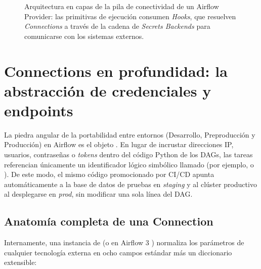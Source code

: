 \begin{figure}[htbp]
{%
}
\caption{Arquitectura en capas de la pila de conectividad de un Airflow Provider: las primitivas de ejecución consumen \textit{Hooks}, que resuelven \textit{Connections} a través de la cadena de \textit{Secrets Backends} para comunicarse con los sistemas externos.}
\label{fig:pila-conectividad-provider}
\end{figure}

\section{Connections en profundidad: la abstracción de credenciales y endpoints}\label{sec:connections-profundidad}

La piedra angular de la portabilidad entre entornos (Desarrollo, Preproducción y Producción) en Airflow es el objeto . En lugar de incrustar direcciones IP, usuarios, contraseñas o \textit{tokens} dentro del código Python de los DAGs, las tareas referencian únicamente un identificador lógico simbólico llamado  (por ejemplo,  o ). De este modo, el mismo código promocionado por CI/CD apunta automáticamente a la base de datos de pruebas en \textit{staging} y al clúster productivo al desplegarse en \textit{prod}, sin modificar una sola línea del DAG.

\subsection{Anatomía completa de una Connection}

Internamente, una instancia de  (o  en Airflow 3 ) normaliza los parámetros de cualquier tecnología externa en ocho campos estándar más un diccionario extensible:

